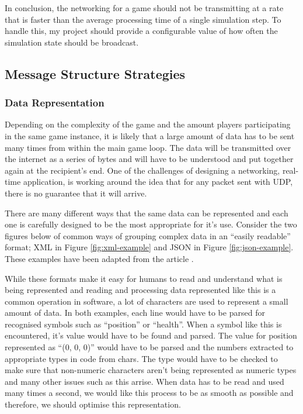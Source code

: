 In conclusion, the networking for a game should not be transmitting at a rate that is faster than the average processing time of a single simulation step. To handle this, my project should provide a configurable value of how often the simulation state should be broadcast.


\subsection{Message Structure Strategies}
\subsubsection{Data Representation}
Depending on the complexity of the game and the amount players participating in the same game instance, it is likely that a large amount of data has to be sent many times from within the main game loop. The data will be transmitted over the internet as a series of bytes and will have to be understood and put together again at the recipient's end. One of the challenges of designing a networking, real-time application, is working around the idea that for any packet sent with UDP, there is no guarantee that it will arrive.

There are many different ways that the same data can be represented and each one is carefully designed to be the most appropriate for it's use. Consider the two figures below of common ways of grouping complex data in an ``easily readable'' format; XML in Figure \ref{fig:xml-example} and JSON in Figure \ref{fig:json-example}. These examples have been adapted from the article .

While these formats make it easy for humans to read and understand what is being represented and reading and processing data represented like this is a common operation in software, a lot of characters are used to represent a small amount of data. In both examples, each line would have to be parsed for recognised symbols such as ``position'' or ``health''. When a symbol like this is encountered, it's value would have to be found and parsed. The value for position represented as ``(0, 0, 0)'' would have to be parsed and the numbers extracted to appropriate types in code from chars. The type would have to be checked to make sure that non-numeric characters aren't being represented as numeric types and many other issues such as this arrise. When data has to be read and used many times a second, we would like this process to be as smooth as possible and therefore, we should optimise this representation.

